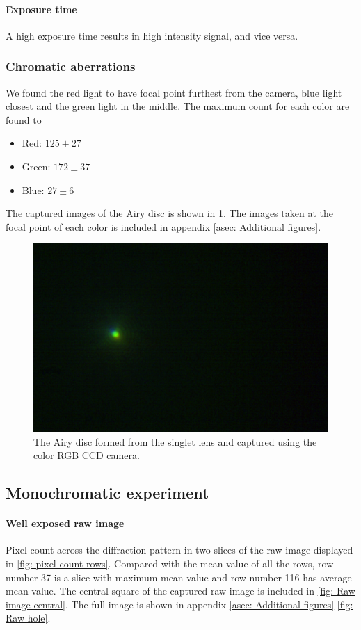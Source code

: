 \documentclass{emulateapj}
\begin{document}
\paragraph{Exposure time}
A high exposure time results in high intensity signal, and vice versa.

\subsubsection{Chromatic aberrations}
We found the red light to have focal point furthest from the camera, blue light closest and the green light in the middle. The maximum count for each color are found to
\begin{itemize}
	\item Red: $125 \pm 27$
	\item Green: $172 \pm 37$
	\item Blue: $27 \pm 6$
\end{itemize}
The captured images of the Airy disc is shown in \cref{fig: Airy disc}. The images taken at the focal point of each color is included in appendix \ref{asec: Additional figures}.

\begin{figure}
	\centering
	\includegraphics[width=0.7\linewidth]{./images/ex2/cali_white.pdf}
	\caption{The Airy disc formed from the singlet lens and captured using the color RGB CCD camera.}
	\label{fig: Airy disc}
\end{figure}
\subsection{Monochromatic experiment}
\label{subsec: Results/ mono exp}

\paragraph{Well exposed raw image}
Pixel count across the diffraction pattern in two slices of the raw image displayed in \cref{fig: pixel count rows}. Compared with the mean value of all the rows, row number 37 is a slice with maximum mean value and row number 116 has average mean value. The central square of the captured raw image is included in \cref{fig: Raw image central}. The full image is shown in appendix \ref{asec: Additional figures} \cref{fig: Raw hole}.
\end{document}

